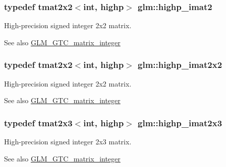 \subsubsection[{highp\+\_\+imat2}]{\setlength{\rightskip}{0pt plus 5cm}typedef tmat2x2$<$int, highp$>$ {\bf glm\+::highp\+\_\+imat2}}\label{group__gtc__matrix__integer_gae1cd6ff099593d2f215bd4ceed538200}
High-\/precision signed integer 2x2 matrix. \begin{DoxySeeAlso}{See also}
\hyperlink{group__gtc__matrix__integer}{G\+L\+M\+\_\+\+G\+T\+C\+\_\+matrix\+\_\+integer} 
\end{DoxySeeAlso}
\hypertarget{group__gtc__matrix__integer_gab4411f2d106d24a32aaa3cb711dc8510}{}
\subsubsection[{highp\+\_\+imat2x2}]{\setlength{\rightskip}{0pt plus 5cm}typedef tmat2x2$<$int, highp$>$ {\bf glm\+::highp\+\_\+imat2x2}}\label{group__gtc__matrix__integer_gab4411f2d106d24a32aaa3cb711dc8510}
High-\/precision signed integer 2x2 matrix. \begin{DoxySeeAlso}{See also}
\hyperlink{group__gtc__matrix__integer}{G\+L\+M\+\_\+\+G\+T\+C\+\_\+matrix\+\_\+integer} 
\end{DoxySeeAlso}
\hypertarget{group__gtc__matrix__integer_ga6c1a5f4d85de3f7eccb394970320bafc}{}
\subsubsection[{highp\+\_\+imat2x3}]{\setlength{\rightskip}{0pt plus 5cm}typedef tmat2x3$<$int, highp$>$ {\bf glm\+::highp\+\_\+imat2x3}}\label{group__gtc__matrix__integer_ga6c1a5f4d85de3f7eccb394970320bafc}
High-\/precision signed integer 2x3 matrix. \begin{DoxySeeAlso}{See also}
\hyperlink{group__gtc__matrix__integer}{G\+L\+M\+\_\+\+G\+T\+C\+\_\+matrix\+\_\+integer} 
\end{DoxySeeAlso}
\hypertarget{group__gtc__matrix__integer_gae7502957eb2ab9268726d87389ae2b55}{}
